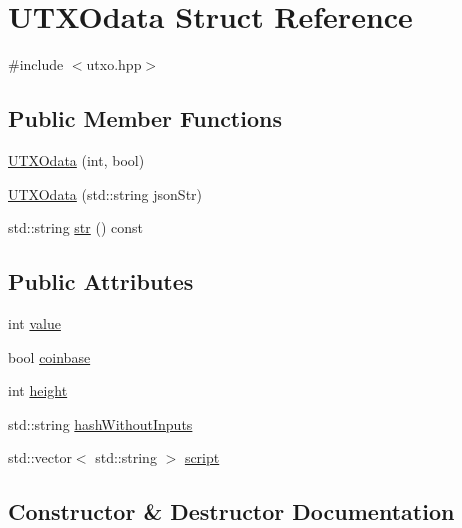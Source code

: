 \hypertarget{structUTXOdata}{}\section{U\+T\+X\+Odata Struct Reference}
\label{structUTXOdata}


{\ttfamily \#include $<$utxo.\+hpp$>$}

\subsection*{Public Member Functions}
\begin{DoxyCompactItemize}
\item 
\mbox{\hyperlink{structUTXOdata_abac0ce6dfed6dab29a00a995d37cc62c}{U\+T\+X\+Odata}} (int, bool)
\item 
\mbox{\hyperlink{structUTXOdata_a0f569e3b932610a822140104fdd418a9}{U\+T\+X\+Odata}} (std\+::string json\+Str)
\item 
std\+::string \mbox{\hyperlink{structUTXOdata_a8416d6a4cc715159a8e2f9da47b5519a}{str}} () const
\end{DoxyCompactItemize}
\subsection*{Public Attributes}
\begin{DoxyCompactItemize}
\item 
int \mbox{\hyperlink{structUTXOdata_a255dc301eba5d915c6a5dc752ec11a86}{value}}
\item 
bool \mbox{\hyperlink{structUTXOdata_aec980c11dde6738bf2120fb3bd3e541f}{coinbase}}
\item 
int \mbox{\hyperlink{structUTXOdata_ac437a55d55e7d7de1bd2558fefccc541}{height}}
\item 
std\+::string \mbox{\hyperlink{structUTXOdata_ae2bfbc7be65eb1c5583084572818ddb2}{hash\+Without\+Inputs}}
\item 
std\+::vector$<$ std\+::string $>$ \mbox{\hyperlink{structUTXOdata_a9195f06da49760fd982965b008f906c2}{script}}
\end{DoxyCompactItemize}


\subsection{Constructor \& Destructor Documentation}
\mbox{\label{structUTXOdata_abac0ce6dfed6dab29a00a995d37cc62c}} 
